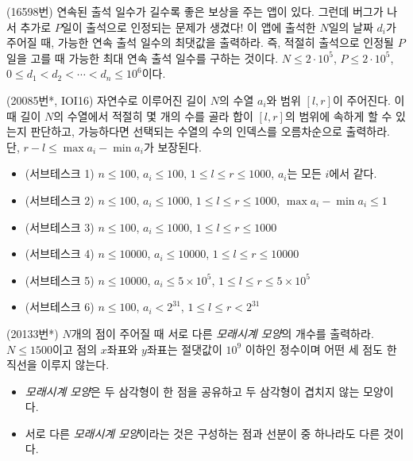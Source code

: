 \begin{problem}
    (16598번) 연속된 출석 일수가 길수록 좋은 보상을 주는 앱이 있다. 그런데 버그가 나서 추가로 $P$일이 출석으로 인정되는 문제가 생겼다! 이 앱에 출석한 $N$일의 날짜 $d_i$가 주어질 때, 가능한 연속 출석 일수의 최댓값을 출력하라. 즉, 적절히 출석으로 인정될 $P$일을 고를 때 가능한 최대 연속 출석 일수를 구하는 것이다. $N \leq 2 \cdot 10^5$, $P \leq 2 \cdot 10^5$, $0 \leq d_1 < d_2 < \cdots < d_n \leq 10^6$이다.
\end{problem}

\begin{problem}
    (20085번*, IOI16) 자연수로 이루어진 길이 $N$의 수열 $a_i$와 범위 $[l, r]$이 주어진다. 이때 길이 $N$의 수열에서 적절히 몇 개의 수를 골라 합이 $[l, r]$의 범위에 속하게 할 수 있는지 판단하고, 가능하다면 선택되는 수열의 수의 인덱스를 오름차순으로 출력하라. 단, $r - l \leq \max a_i - \min a_i$가 보장된다.
    \begin{itemize}
        \item (서브테스크 1) $n \leq 100$, $a_i \leq 100$, $1 \leq l \leq r \leq 1000$, $a_i$는 모든 $i$에서 같다.
        \item (서브테스크 2) $n \leq 100$, $a_i \leq 1000$, $1 \leq l \leq r \leq 1000$, $\max a_i - \min a_i \leq 1$
        \item (서브테스크 3) $n \leq 100$, $a_i \leq 1000$, $1 \leq l \leq r \leq 1000$
        \item (서브테스크 4) $n \leq 10000$, $a_i \leq 10000$, $1 \leq l \leq r \leq 10000$
        \item (서브테스크 5) $n \leq 10000$, $a_i \leq 5 \times 10^5$, $1 \leq l \leq r \leq 5 \times 10^5$
        \item (서브테스크 6) $n \leq 100$, $a_i < 2^31$, $1 \leq l \leq r < 2^31$
    \end{itemize}
\end{problem}

\begin{problem}
    (20133번*) $N$개의 점이 주어질 때 서로 다른 \textit{모래시계 모양}의 개수를 출력하라. $N \leq 1500$이고 점의 $x$좌표와 $y$좌표는 절댓값이 $10^9$ 이하인 정수이며 어떤 세 점도 한 직선을 이루지 않는다.
    \begin{itemize}
        \item \textit{모래시계 모양}은 두 삼각형이 한 점을 공유하고 두 삼각형이 겹치지 않는 모양이다.
        \item 서로 다른 \textit{모래시계 모양}이라는 것은 구성하는 점과 선분이 중 하나라도 다른 것이다.
    \end{itemize}
\end{problem}

